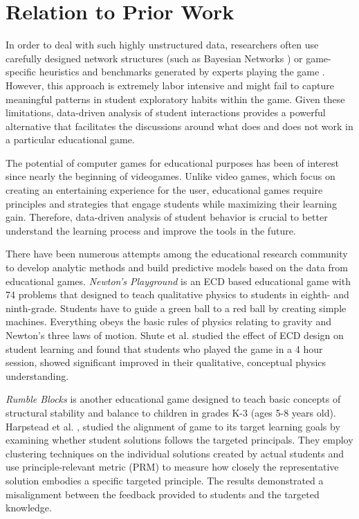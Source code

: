 \documentclass{sigchi}
\begin{document}
\section{Relation to Prior Work}
In order to deal with such highly unstructured data, researchers often use carefully designed network structures (such as Bayesian Networks \cite{albrecht1998bayesian,shute2013stealth}) or game-specific heuristics and benchmarks generated by experts playing the game \cite{mandel2014offline,tastan2011learning}. However, this approach is extremely labor intensive and might fail to capture meaningful patterns in student exploratory habits within the game. Given these limitations, data-driven analysis of student interactions provides a powerful alternative that facilitates the discussions around what does and does not work in a particular educational game.

The potential of computer games for educational purposes has been of interest since nearly the beginning of videogames. Unlike video games, which focus on creating an entertaining experience for the user, educational games require principles and strategies that engage students while maximizing their learning gain. Therefore, data-driven analysis of student behavior is crucial to better understand the learning process and improve the tools in the future.

There have been numerous attempts among the educational research community to develop analytic methods and build predictive models based on the data from educational games. \textit{Newton's Playground} is an ECD based educational game with 74 problems that designed to teach qualitative physics to students in eighth- and ninth-grade. Students have to guide a green ball to a red ball by creating simple machines. 
Everything obeys the basic rules of physics relating to gravity and Newton’s three laws of motion. 
Shute et al. \cite{shute2013stealth} studied the effect of ECD design on student learning and found that students who played the game in a 4 hour session, showed significant improved in their qualitative, conceptual physics understanding.

\textit {Rumble Blocks}  is another educational game designed to teach basic concepts of structural stability and balance to children in grades K-3 (ages 5-8 years old). Harpstead et al. \cite{harpstead2014using}, studied the alignment of game to its target learning goals by examining whether student solutions follows the targeted principals. They employ clustering techniques on the individual solutions created by actual students and use principle-relevant metric (PRM) to measure how closely the representative solution embodies a specific targeted principle. The results demonstrated a misalignment between the feedback provided to students and the targeted knowledge.
\end{document}
